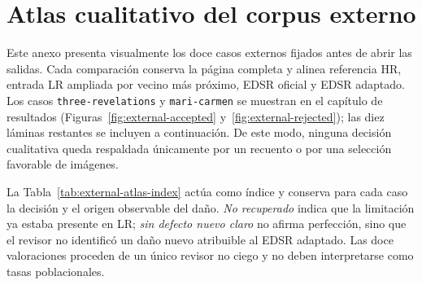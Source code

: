 \chapter{Atlas cualitativo del corpus externo}
\label{app:external-case-atlas}

Este anexo presenta visualmente los doce casos externos fijados antes de abrir las salidas. Cada
comparación conserva la página completa y alinea referencia HR, entrada LR ampliada por vecino más
próximo, EDSR oficial y EDSR adaptado. Los casos \texttt{three-revelations} y
\texttt{mari-carmen} se muestran en el capítulo de resultados
(Figuras~\ref{fig:external-accepted} y~\ref{fig:external-rejected}); las diez láminas restantes se
incluyen a continuación. De este modo, ninguna decisión cualitativa queda respaldada únicamente por
un recuento o por una selección favorable de imágenes.

La Tabla~\ref{tab:external-atlas-index} actúa como índice y conserva para cada caso la decisión y el
origen observable del daño. \emph{No recuperado} indica que la limitación ya estaba presente en LR;
\emph{sin defecto nuevo claro} no afirma perfección, sino que el revisor no identificó un daño nuevo
atribuible al EDSR adaptado. Las doce valoraciones proceden de un único revisor no ciego y no deben
interpretarse como tasas poblacionales.

